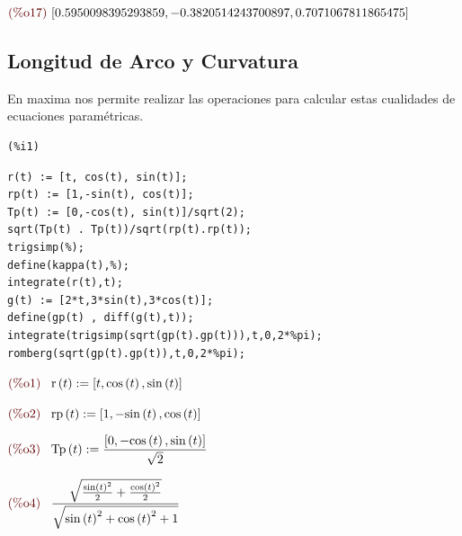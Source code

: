 \documentclass[12pt]{article}
\begin{document}
\begin{math}\displaystyle
\parbox{8ex}{\color{labelcolor}(\%o17) }
[0.5950098395293859,-0.3820514243700897,0.7071067811865475]
\end{math}


\subsection{Longitud de Arco y Curvatura}
En maxima nos permite realizar las operaciones para calcular estas cualidades de ecuaciones paramétricas.

\noindent

\begin{minipage}[t]{8ex}{\color{red}\bf
\begin{verbatim}
(%i1) 
\end{verbatim}}
\end{minipage}
\begin{minipage}[t]{\textwidth}{\color{blue}
\begin{verbatim}
r(t) := [t, cos(t), sin(t)];
rp(t) := [1,-sin(t), cos(t)];
Tp(t) := [0,-cos(t), sin(t)]/sqrt(2);
sqrt(Tp(t) . Tp(t))/sqrt(rp(t).rp(t));
trigsimp(%);
define(kappa(t),%);
integrate(r(t),t);
g(t) := [2*t,3*sin(t),3*cos(t)];
define(gp(t) , diff(g(t),t));
integrate(trigsimp(sqrt(gp(t).gp(t))),t,0,2*%pi);
romberg(sqrt(gp(t).gp(t)),t,0,2*%pi);
\end{verbatim}}
\end{minipage}
\begin{math}\displaystyle
\parbox{8ex}{\color{labelcolor}(\%o1) }
\mathrm{r}\left( t\right) :=[t,\mathrm{cos}\left( t\right) ,\mathrm{sin}\left( t\right) ]
\end{math}

\begin{math}\displaystyle
\parbox{8ex}{\color{labelcolor}(\%o2) }
\mathrm{rp}\left( t\right) :=[1,-\mathrm{sin}\left( t\right) ,\mathrm{cos}\left( t\right) ]
\end{math}

\begin{math}\displaystyle
\parbox{8ex}{\color{labelcolor}(\%o3) }
\mathrm{Tp}\left( t\right) :=\frac{[0,-\mathrm{cos}\left( t\right) ,\mathrm{sin}\left( t\right) ]}{\sqrt{2}}
\end{math}

\begin{math}\displaystyle
\parbox{8ex}{\color{labelcolor}(\%o4) }
\frac{\sqrt{\frac{{\mathrm{sin}\left( t\right) }^{2}}{2}+\frac{{\mathrm{cos}\left( t\right) }^{2}}{2}}}{\sqrt{{\mathrm{sin}\left( t\right) }^{2}+{\mathrm{cos}\left( t\right) }^{2}+1}}
\end{math}
\end{document}
